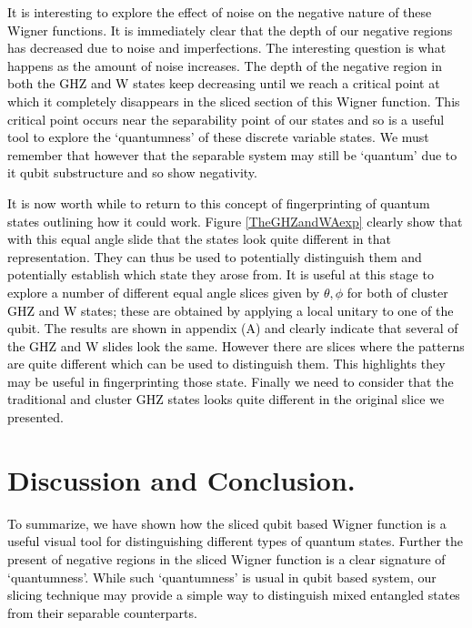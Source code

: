 \documentclass[pra,reprint,showkeys,showpacs,times,superscriptaddress]{revtex4-1}
\newcommand{\red}{\textcolor{black}}
\begin{document}
\red{It is interesting to explore the effect of noise on the negative nature of these Wigner functions. It is immediately clear that the depth of our negative regions has decreased due to noise and imperfections. The interesting question is what happens as the amount of noise increases. The depth of the negative region in both the GHZ and W states keep decreasing until we reach a critical point at which it completely disappears in the sliced section of this Wigner function. This critical point occurs near the separability point of our states and so is a useful tool to explore the `quantumness' of these discrete variable states. We must remember that however that the separable system may still be `quantum' due to it qubit substructure and so show negativity. }

\red{It is now worth while to return to this concept of fingerprinting of quantum states outlining how it could work. Figure \ref{TheGHZandWAexp} clearly show that with this equal angle slide that the states look quite different in that representation. They can thus be used to potentially distinguish them and potentially establish which state they arose from. It is useful at this stage to explore a number of different equal angle slices given by $\theta,\phi$ for both of cluster GHZ and W states; these are obtained by applying a local unitary to one of the qubit. The results are shown in appendix (A) and  clearly indicate that several of the GHZ and W slides look the same. However there are slices where the patterns are quite different which can be used to distinguish them. This highlights they may be useful in fingerprinting those state. Finally we need to consider that the traditional and cluster GHZ states looks quite different in the original slice we presented.}






\section{Discussion and Conclusion.}

\red{To summarize, we have shown how the sliced qubit based Wigner function is a useful visual tool for distinguishing different types of quantum states.  Further the present of negative regions in the sliced Wigner function is a clear signature of `quantumness'. While such `quantumness'  is usual in qubit based system, our slicing technique may provide a simple way to distinguish mixed entangled states from their separable counterparts.
}
\end{document}
